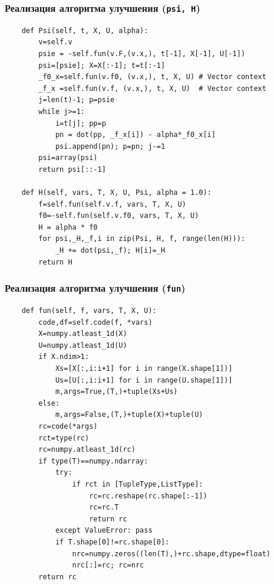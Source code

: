 \documentclass[10pt]{beamer}
\begin{document}
\begin{frame}[fragile]
  \frametitle{Реализация алгоритма улучшения (\texttt{psi, H})}
\begin{lstlisting}
    def Psi(self, t, X, U, alpha):
        v=self.v
        psie = -self.fun(v.F,(v.x,), t[-1], X[-1], U[-1])
        psi=[psie]; X=X[:-1]; t=t[:-1]
        _f0_x=self.fun(v.f0, (v.x,), t, X, U) # Vector context
        _f_x =self.fun(v.f, (v.x,), t, X, U)  # Vector context
        j=len(t)-1; p=psie
        while j>=1:
            i=t[j]; pp=p
            pn = dot(pp, _f_x[i]) - alpha*_f0_x[i]
            psi.append(pn); p=pn; j-=1
        psi=array(psi)
        return psi[::-1]

    def H(self, vars, T, X, U, Psi, alpha = 1.0):
        f=self.fun(self.v.f, vars, T, X, U)
        f0=-self.fun(self.v.f0, vars, T, X, U)
        H = alpha * f0
        for psi,_H,_f,i in zip(Psi, H, f, range(len(H))):
            _H += dot(psi,_f); H[i]=_H
        return H
\end{lstlisting}
\end{frame}
\begin{frame}[fragile]
  \frametitle{Реализация алгоритма улучшения (\texttt{fun})}
\begin{lstlisting}
    def fun(self, f, vars, T, X, U):
        code,df=self.code(f, *vars)
        X=numpy.atleast_1d(X)
        U=numpy.atleast_1d(U)
        if X.ndim>1:
            Xs=[X[:,i:i+1] for i in range(X.shape[1])]
            Us=[U[:,i:i+1] for i in range(U.shape[1])]
            m,args=True,(T,)+tuple(Xs+Us)
        else:
            m,args=False,(T,)+tuple(X)+tuple(U)
        rc=code(*args)
        rct=type(rc)
        rc=numpy.atleast_1d(rc)
        if type(T)==numpy.ndarray:
            try:
                if rct in [TupleType,ListType]:
                    rc=rc.reshape(rc.shape[:-1])
                    rc=rc.T
                    return rc
            except ValueError: pass
            if T.shape[0]!=rc.shape[0]:
                nrc=numpy.zeros((len(T),)+rc.shape,dtype=float)
                nrc[:]=rc; rc=nrc
        return rc
\end{lstlisting}
\end{frame}
\end{document}
